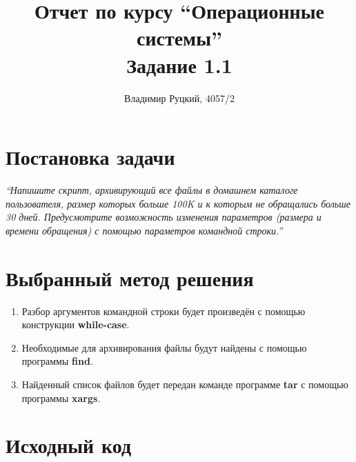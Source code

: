 \documentclass[a4paper,12pt]{article}
\title{Отчет по курсу ``Операционные системы'' \\ Задание 1.1}
\author{Владимир Руцкий, 4057/2}
\newcommand{\commandquote}[1]{\textbf{#1}}
\begin{document}
\maketitle

\section*{Постановка задачи}
\textit{``Напишите скрипт, архивирующий все файлы в домашнем каталоге пользователя,
размер которых больше 100K и к которым не обращались больше 30 дней.
Предусмотрите возможность изменения параметров (размера и времени
обращения) с помощью параметров командной строки.''}

\section*{Выбранный метод решения}
\begin{enumerate}
 \item Разбор аргументов командной строки будет произведён с помощью конструкции \commandquote{while-case}.
 \item Необходимые для архивирования файлы будут найдены с помощью программы \commandquote{find}.
 \item Найденный список файлов будет передан команде программе \commandquote{tar} 
с помощью программы \commandquote{xargs}.
\end{enumerate}

\section*{Исходный код}
\lstset{language=bash, caption=task\_1\_1.sh,%
label=source-code, basicstyle=\footnotesize,%
numbers=left, numberstyle=\footnotesize, numbersep=5pt, frame=single, breaklines=true, breakatwhitespace=false,%
inputencoding=utf8x}

\end{document}
